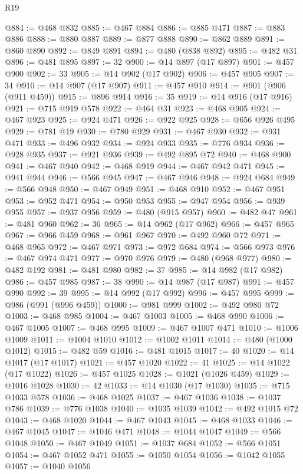 \begin{lexlean}{R19}
\begin{coremodule}
@884 := @468 @832
@885 := @467 @884
@886 := @885 @471
@887 := @883 @886
@888 := @880 @887
@889 := @877 @888
@890 := @862 @889
@891 := @860 @890
@892 := @849 @891
@894 := @480 (@838 @892)
@895 := @482 @31
@896 := @481 @895
@897 := 32
@900 := @14 @897 (@17 @897)
@901 := @457 @900
@902 := 33
@905 := @14 @902 (@17 @902)
@906 := @457 @905
@907 := 34
@910 := @14 @907 (@17 @907)
@911 := @457 @910
@914 := @901 (@906 (@911 @459))
@915 := @896 @914
@916 := 35
@919 := @14 @916 (@17 @916)
@921 := @715 @919 @578
@922 := @464 @31
@923 := @468 @905
@924 := @467 @923
@925 := @924 @471
@926 := @922 @925
@928 := @656 @926 @495
@929 := @781 @19
@930 := @780 @929
@931 := @467 @930
@932 := @931 @471
@933 := @496 @932
@934 := @924 @933
@935 := @776 @934
@936 := @928 @935
@937 := @921 @936
@939 := @492 @895 @72
@940 := @468 @900
@941 := @467 @940
@942 := @468 @919
@944 := @467 @942 @471
@945 := @941 @944
@946 := @566 @945
@947 := @467 @946
@948 := @924 @684
@949 := @566 @948
@950 := @467 @949
@951 := @468 @910
@952 := @467 @951
@953 := @952 @471
@954 := @950 @953
@955 := @947 @954
@956 := @939 @955
@957 := @937 @956
@959 := @480 (@915 @957)
@960 := @482 @47
@961 := @481 @960
@962 := 36
@965 := @14 @962 (@17 @962)
@966 := @457 @965
@967 := @966 @459
@968 := @961 @967
@970 := @492 @960 @72
@971 := @468 @965
@972 := @467 @971
@973 := @972 @684
@974 := @566 @973
@976 := @467 @974 @471
@977 := @970 @976
@979 := @480 (@968 @977)
@980 := @482 @192
@981 := @481 @980
@982 := 37
@985 := @14 @982 (@17 @982)
@986 := @457 @985
@987 := 38
@990 := @14 @987 (@17 @987)
@991 := @457 @990
@992 := 39
@995 := @14 @992 (@17 @992)
@996 := @457 @995
@999 := @986 (@991 (@996 @459))
@1000 := @981 @999
@1002 := @492 @980 @72
@1003 := @468 @985
@1004 := @467 @1003
@1005 := @468 @990
@1006 := @467 @1005
@1007 := @468 @995
@1009 := @467 @1007 @471
@1010 := @1006 @1009
@1011 := @1004 @1010
@1012 := @1002 @1011
@1014 := @480 (@1000 @1012)
@1015 := @482 @59
@1016 := @481 @1015
@1017 := 40
@1020 := @14 @1017 (@17 @1017)
@1021 := @457 @1020
@1022 := 41
@1025 := @14 @1022 (@17 @1022)
@1026 := @457 @1025
@1028 := @1021 (@1026 @459)
@1029 := @1016 @1028
@1030 := 42
@1033 := @14 @1030 (@17 @1030)
@1035 := @715 @1033 @578
@1036 := @468 @1025
@1037 := @467 @1036
@1038 := @1037 @786
@1039 := @776 @1038
@1040 := @1035 @1039
@1042 := @492 @1015 @72
@1043 := @468 @1020
@1044 := @467 @1043
@1045 := @468 @1033
@1046 := @467 @1045
@1047 := @1046 @471
@1048 := @1044 @1047
@1049 := @566 @1048
@1050 := @467 @1049
@1051 := @1037 @684
@1052 := @566 @1051
@1054 := @467 @1052 @471
@1055 := @1050 @1054
@1056 := @1042 @1055
@1057 := @1040 @1056

\end{coremodule}
\end{lexlean}
